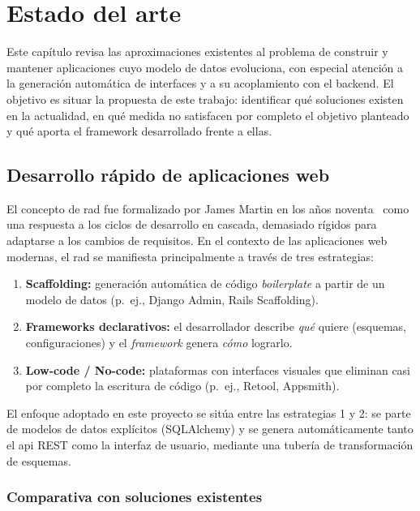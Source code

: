 \chapter{Estado del arte}
\label{ch:estado-arte}

Este capítulo revisa las aproximaciones existentes al problema de construir y
mantener aplicaciones cuyo modelo de datos evoluciona, con especial atención a
la generación automática de interfaces y a su acoplamiento con el \gls{backend}.
El objetivo es situar la propuesta de este trabajo: identificar qué soluciones
existen en la actualidad, en qué medida no satisfacen por completo el objetivo
planteado y qué aporta el \gls{framework} desarrollado frente a ellas.

\section{Desarrollo rápido de aplicaciones web}
\label{sec:rad}

El concepto de \gls{rad} fue formalizado por James Martin en los años noventa~\cite{martin1991rad} como
una respuesta a los ciclos de desarrollo en cascada, demasiado rígidos para adaptarse a los
cambios de requisitos. En el contexto de las aplicaciones web modernas, el \gls{rad} se
manifiesta principalmente a través de tres estrategias:

\begin{enumerate}
  \item \textbf{Scaffolding:} generación automática de código \emph{boilerplate} a partir de un
    modelo de datos (p.~ej., Django Admin, Rails Scaffolding).
  \item \textbf{Frameworks declarativos:} el desarrollador describe \textit{qué} quiere
    (esquemas, configuraciones) y el \textit{framework} genera \textit{cómo} lograrlo.
  \item \textbf{Low-code / No-code:} plataformas con interfaces visuales que eliminan
    casi por completo la escritura de código (p.~ej., Retool, Appsmith).
\end{enumerate}

El enfoque adoptado en este proyecto se sitúa entre las estrategias 1 y 2: se parte de
modelos de datos explícitos (SQLAlchemy) y se genera automáticamente tanto el
\gls{api} REST como la interfaz de usuario, mediante una tubería de transformación de
esquemas.

\subsection{Comparativa con soluciones existentes}
\label{subsec:comparativa}

